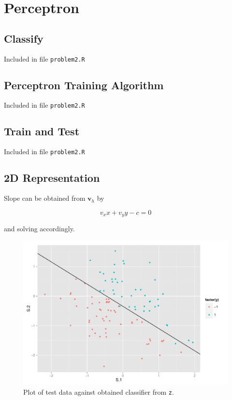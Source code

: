 \documentclass[11pt]{scrartcl}
\begin{document}
\section{Perceptron}

\subsection{Classify}

Included in file \texttt{problem2.R}

\subsection{Perceptron Training Algorithm}

Included in file \texttt{problem2.R}

\subsection{Train and Test}

Included in file \texttt{problem2.R}

\subsection{2D Representation}

Slope can be obtained from $\mathbf{v}_h$ by

\[v_x x + v_y y - c = 0\]

and solving accordingly.

\begin{figure}[H]
\centering\includegraphics[width=\textwidth]{./hw2/r/test.pdf}
\caption{Plot of test data against obtained classifier from \texttt{z}.}
\end{figure}
\end{document}
